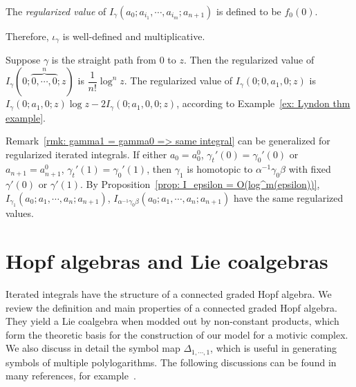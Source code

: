 \begin{definition}
The \textit{regularized value} of $I_\gamma(a_0;a_{i_1},\cdots,a_{i_m};a_{n+1})$ is defined to be $f_0(0)$.
\end{definition}

Therefore, $\iota_\gamma$ is well-defined and multiplicative.

\begin{example}
Suppose $\gamma$ is the straight path from $0$ to $z$. Then the regularized value of $I_\gamma(0;\overbrace{0,\cdots,0}^{n};z)$ is $\dfrac{1}{n!}\log^nz$. The regularized value of $I_\gamma(0;0,a_1,0;z)$ is $I_\gamma(0;a_1,0;z)\log z-2I_\gamma(0;a_1,0,0;z)$, according to Example~\ref{ex: Lyndon thm example}.
\end{example}

\begin{remark}\label{rmk: gamma1 = gamma0 => same reg integral}
Remark~\ref{rmk: gamma1 = gamma0 => same integral} can be generalized for regularized iterated integrals. If either $a_0=a^0_0$, $\gamma_t'(0)=\gamma_0'(0)$ or $a_{n+1}=a^0_{n+1}$, $\gamma_t'(1)=\gamma_0'(1)$, then $\gamma_1$ is homotopic to $\alpha^{-1}\gamma_0\beta$ with fixed $\gamma'(0)$ or $\gamma'(1)$. By Proposition~\ref{prop: I_epsilon = O(log^m(epsilon))},  $I_{\gamma_1}(a_0;a_1,\cdots,a_n;a_{n+1})$, $I_{\alpha^{-1}\gamma_0\beta}(a_0;a_1,\cdots,a_n;a_{n+1})$ have the same regularized values.
\end{remark}


\section{Hopf algebras and Lie coalgebras}

Iterated integrals have the structure of a connected graded Hopf algebra. We review the definition and main properties of a connected graded Hopf algebra. They yield a Lie coalgebra when modded out by non-constant products, which form the theoretic basis for the construction of our model for a motivic complex. We also discuss in detail the symbol map $\Delta_{1,\cdots,1}$, which is useful in generating symbols of multiple polylogarithms. The following discussions can be found in many references, for example~\cite{Radford_HopfAlgebras}.

